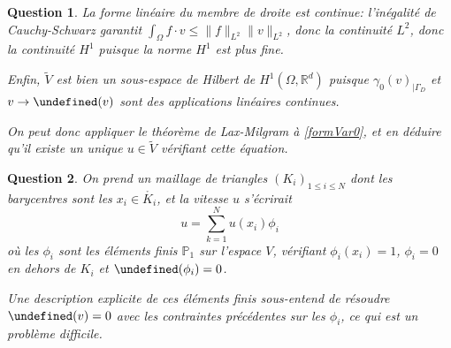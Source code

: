 \documentclass{article}
\newcommand{\RR}{\mathbb R}
\newcommand{\PP}{\mathbb P}
\theoremstyle{plain}
\newtheorem{ques}{Question}
\let\div\undefined
\DeclareMathOperator{\div}{div}
\begin{document}
\begin{ques}
La forme linéaire du membre de droite est continue: l'inégalité de Cauchy-Schwarz garantit $\int_\Omega f\cdot v\leq \|f\|_{L^2}\|v\|_{L^2}$, donc la continuité $L^2$, donc la continuité $H^1$ puisque la norme $H^1$ est plus fine.

Enfin, $\tilde{V}$ est bien un sous-espace de Hilbert de $H^1(\Omega,\RR^d)$ puisque $\gamma_0(v)_{|\Gamma_D}$ et $v \rightarrow \div(v)$ sont des applications linéaires continues.

On peut donc appliquer le théorème de Lax-Milgram à \eqref{formVar0}, et en déduire qu'il existe un unique $u\in \tilde{V}$ vérifiant cette équation.

\end{ques}

\begin{ques}

On prend un maillage de triangles $(K_i)_{1\leq i\leq N}$ dont les barycentres sont les $x_i\in \mathring{K_i}$, et la vitesse $u$ s'écrirait
\[
    u = \sum_{k=1}^N u(x_i)\phi_i
\]
où les $\phi_i$ sont les éléments finis $\PP_1$ sur l'espace $V$, vérifiant $\phi_i(x_i) = 1$, $\phi_i = 0$ en dehors de $K_i$ et $\div(\phi_i) = 0$.

Une description explicite de ces éléments finis sous-entend de résoudre $\div(v) = 0$ avec les contraintes précédentes sur les $\phi_i$, ce qui est un problème difficile.
\end{ques}
\end{document}
